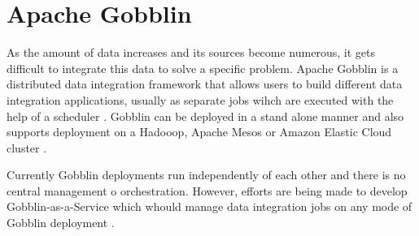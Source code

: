 \section{Apache Gobblin}

As the amount of data increases and its sources become numerous, it
gets difficult to integrate this data to solve a specific
problem. Apache Gobblin \cite{hid-sp18-www-gobblin} is a distributed
data integration framework that allows users to build different data
integration applications, usually as separate jobs wihch are executed
with the help of a scheduler
\cite{hid-sp18-503-www-gobblin-docs}. Gobblin can be deployed in a
stand alone manner and also supports deployment on a Hadooop, Apache
Mesos or Amazon Elastic Cloud cluster \cite{hid-sp18-503-gobblin}.

Currently Gobblin deployments run independently of each other and
there is no central management o orchestration. However, efforts are
being made to develop Gobblin-as-a-Service which whould manage data
integration jobs on any mode of Gobblin deployment
\cite{hid-sp18-503-www-gobblin-docs}.
